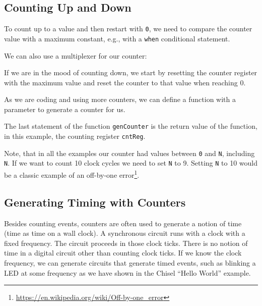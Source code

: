 \documentclass[%
    10pt,
    headinclude, footexclude,
    openright, %
    notitlepage,
    cleardoubleempty,
    headsepline,
    pointlessnumbers,
    bibtotoc, idxtotoc,
    ]{scrbook}
\newcommand{\code}[1]{{\small{\texttt{#1}}}}
\newcommand{\myref}[2]{\href{#1}{#2}}
\renewcommand{\myref}[2]{{#2}{\footnote{\url{#1}}}}
\begin{document}

\subsection{Counting Up and Down}

To count up to a value and then restart with \code{0}, we need to compare
the counter value with a maximum constant, e.g., with a \code{when}
conditional statement.


\noindent We can also use a multiplexer for our counter:


\noindent If we are in the mood of counting down, we start by resetting the counter register
with the maximum value and reset the counter to that value when reaching 0.


\noindent As we are coding and using more counters, we can
define a function with a parameter to generate a counter for us.


\noindent The last statement of the function \code{genCounter} is the return
value of the function, in this example, the counting register \code{cntReg}.

Note, that in all the examples our counter had values between \code{0} and
\code{N}, including \code{N}. If we want to count 10 clock cycles we need
to set \code{N} to 9. Setting \code{N} to 10 would be a classic example of an
\myref{https://en.wikipedia.org/wiki/Off-by-one_error}{off-by-one error}.

\subsection{Generating Timing with Counters}
\label{sec:gen:timing}


Besides counting events, counters are often used to generate a notion of time
(time as time on a wall clock).
A synchronous circuit runs with a clock with a fixed frequency.
The circuit proceeds in those clock ticks. There is no notion of time in a digital
circuit other than counting clock ticks. If we know the clock frequency, we
can generate circuits that generate timed events, such as blinking a LED
at some frequency as we have shown in the Chisel ``Hello World'' example.
\end{document}
